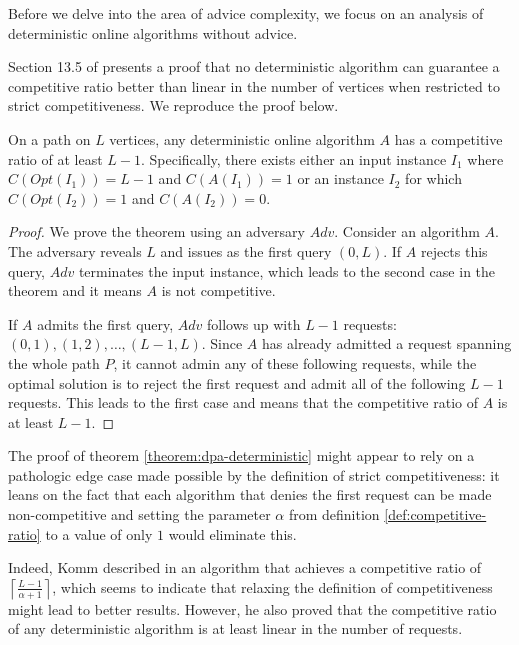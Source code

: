 Before we delve into the area of advice complexity, we focus on an
analysis of deterministic online algorithms without advice.

Section 13.5 of \cite{dpa-book} presents a proof that no deterministic
algorithm can guarantee a competitive ratio better than linear in the
number of vertices when restricted to strict competitiveness. We reproduce
the proof below.

\begin{theorem}\label{theorem:dpa-deterministic}
    On a path on $L$ vertices, any deterministic online algorithm $A$ has
    a competitive ratio of at least $L - 1$. Specifically, there exists
    either an input instance $I_1$ where $C(Opt(I_1)) = L - 1$ and
    $C(A(I_1)) = 1$ or an instance $I_2$ for which $C(Opt(I_2)) = 1$ and
    $C(A(I_2)) = 0$.
\end{theorem}

\begin{proof}
    We prove the theorem using an adversary $Adv$. Consider an algorithm
    $A$. The adversary reveals $L$ and issues as the first query $(0, L)$.
    If $A$ rejects this query, $Adv$ terminates the input instance, which
    leads to the second case in the theorem and it means $A$ is not
    competitive.

    If $A$ admits the first query, $Adv$ follows up with $L - 1$ requests:
    $(0, 1), (1, 2), \dots, (L - 1, L)$. Since $A$ has already admitted a
    request spanning the whole path $P$, it cannot admin any of these
    following requests, while the optimal solution is to reject the first
    request and admit all of the following $L - 1$ requests. This leads
    to the first case and means that the competitive ratio of $A$ is at
    least $L - 1$.
\end{proof}

The proof of theorem \ref{theorem:dpa-deterministic} might appear to rely
on a pathologic edge case made possible by the definition of strict
competitiveness: it leans on the fact that each algorithm that denies the
first request can be made non-competitive and setting the parameter
$\alpha$ from definition \ref{def:competitive-ratio} to a value of only
$1$ would eliminate this.

Indeed, Komm described in \cite{komm-thesis} an algorithm that achieves a
competitive ratio of $\left\lceil\frac{L-1}{\alpha+1}\right\rceil$, which
seems to indicate that relaxing the definition of competitiveness might
lead to better results. However, he also proved that the competitive ratio
of any deterministic algorithm is at least linear in the number of
requests.

